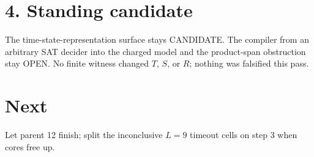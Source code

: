 \documentclass[11pt]{article}
\begin{document}
\section*{4. Standing candidate}
The time-state-representation surface stays CANDIDATE. The compiler from an arbitrary SAT decider into the charged model and the product-span obstruction stay OPEN. No finite witness changed $T$, $S$, or $R$; nothing was falsified this pass.

\section*{Next}
Let parent 12 finish; split the inconclusive $L=9$ timeout cells on step 3 when cores free up.
\end{document}
